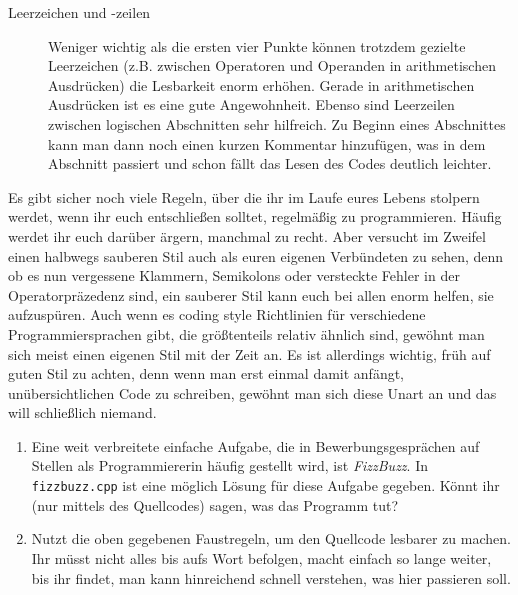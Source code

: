 \begin{description}
    \item[Leerzeichen und -zeilen]
          Weniger wichtig als die ersten vier Punkte können trotzdem gezielte
          Leerzeichen (z.B. zwischen Operatoren und Operanden in arithmetischen
          Ausdrücken) die Lesbarkeit enorm erhöhen. Gerade in arithmetischen
          Ausdrücken ist es eine gute Angewohnheit.
          Ebenso sind Leerzeilen zwischen logischen Abschnitten sehr hilfreich. Zu Beginn eines Abschnittes kann man dann noch einen kurzen Kommentar hinzufügen, was in dem Abschnitt passiert und schon fällt das Lesen des Codes deutlich leichter.
\end{description}

Es gibt sicher noch viele Regeln, über die ihr im Laufe eures Lebens stolpern
werdet, wenn ihr euch entschließen solltet, regelmäßig zu programmieren. Häufig
werdet ihr euch darüber ärgern, manchmal zu recht. Aber versucht im Zweifel
einen halbwegs sauberen Stil auch als euren eigenen Verbündeten zu sehen, denn
ob es nun vergessene Klammern, Semikolons oder versteckte Fehler in der
Operatorpräzedenz sind, ein sauberer Stil kann euch bei allen enorm helfen, sie
aufzuspüren. Auch wenn es coding style Richtlinien für verschiedene Programmiersprachen gibt, die größtenteils relativ ähnlich sind, gewöhnt man sich meist einen eigenen Stil mit der Zeit an. Es ist allerdings wichtig, früh auf guten Stil zu achten, denn wenn man erst einmal damit anfängt, unübersichtlichen Code zu schreiben, gewöhnt man sich diese Unart an und das will schließlich niemand.

\begin{praxis}
    \begin{enumerate}
        \item Eine weit verbreitete einfache Aufgabe, die in Bewerbungsgesprächen
              auf Stellen als Programmiererin häufig gestellt wird, ist
              \emph{FizzBuzz}. In \texttt{fizzbuzz.cpp} ist eine möglich Lösung für
              diese Aufgabe gegeben. Könnt ihr (nur mittels des Quellcodes) sagen,
              was das Programm tut?
        \item Nutzt die oben gegebenen Faustregeln, um den Quellcode lesbarer zu
              machen. Ihr müsst nicht alles bis aufs Wort befolgen, macht einfach so
              lange weiter, bis ihr findet, man kann hinreichend schnell verstehen,
              was hier passieren soll.
    \end{enumerate}

\end{praxis}

